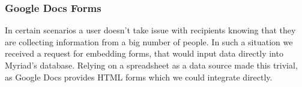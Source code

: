 \subsubsection{Google Docs Forms}

In certain scenarios a user doesn't take issue with recipients knowing that they are collecting information from a big number of people. In such a situation we received a request for embedding forms, that would input data directly into Myriad’s database. Relying on a spreadsheet as a data source made this trivial, as Google Docs provides HTML forms which we could integrate directly.


%
%
%
%
%
%
%
%
%
%
%

